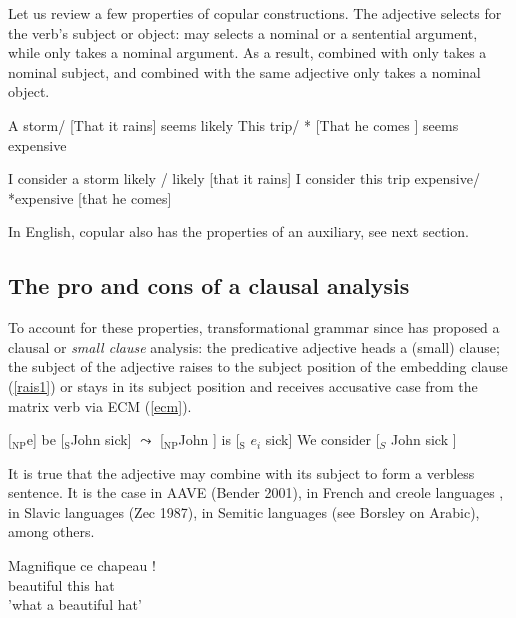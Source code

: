 \documentclass[output=paper]{langsci/langscibook}
\begin{document}
Let us review a few properties of copular constructions.
The adjective selects for the verb's subject or object:  may selects a nominal or a sentential argument, while  only takes a nominal argument. As a result,  combined with  only takes a nominal subject, and  combined with the same adjective only takes a nominal object.


\begin{exe}
\ex \label{storm}
\begin{xlist}
\ex A storm/ [That it rains] seems likely
\ex This trip/ * [That he comes ] seems expensive
\end{xlist}
\ex \begin{xlist}
\ex 	I consider a storm likely / likely [that it rains]
\ex 	I consider this trip expensive/ *expensive [that he comes]
\end{xlist}	
\end{exe}

In English, copular  also has the properties of an auxiliary, see next section.

\subsection{The pro and cons of a clausal analysis}
To account for these properties, transformational grammar since \citet{Chomsky1986, Stowell1983} has proposed a clausal or \emph{small clause} analysis: the predicative adjective heads a (small) clause; the subject of the adjective raises to the subject position of the embedding clause (\ref{rais1}) or stays in its subject position and receives accusative case from the matrix verb via ECM (\ref{ecm}).


\begin{exe}
\ex  $[$$_{\text{NP}}$e] be [$_{\text{S}}$John sick] $\leadsto$  [$_{\text{NP}}$John ] is  [$_{\text{S}}$ $e_{i}$ sick] \label{rais1}
\ex   We consider [$_{S}$ John sick ] \label{ecm}
\end{exe}

It is true that the adjective may combine with its subject to form a verbless sentence. It is the case in AAVE (Bender 2001), in French \citet{Laurens2008} and creole languages \citet{HenriandAbeille2007}, in Slavic languages (Zec 1987), in Semitic languages (see Borsley on Arabic), among others. 

\begin{exe}
\ex \gll Magnifique ce chapeau !\\
beautiful this hat\\
\glt 'what a beautiful hat'
\end{exe}
\end{document}
